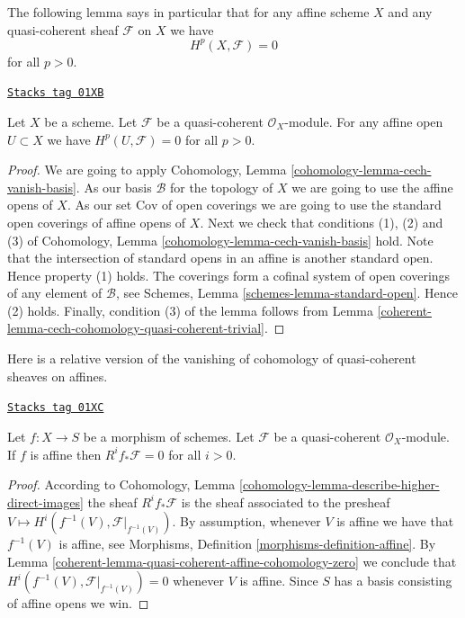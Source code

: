 The following lemma says in particular that for any affine scheme
$X$ and any quasi-coherent sheaf $\mathcal{F}$ on $X$ we have
$$
H^p(X, \mathcal{F}) = 0
$$
for all $p > 0$.

\begin{lemma}
\label{coherent-lemma-quasi-coherent-affine-cohomology-zero}
\href{https://stacks.math.columbia.edu/tag/01XB}{\texttt{Stacks tag 01XB}}


Let $X$ be a scheme.
Let $\mathcal{F}$ be a quasi-coherent $\mathcal{O}_X$-module.
For any affine open $U \subset X$ we have
$H^p(U, \mathcal{F}) = 0$ for all $p > 0$.
\end{lemma}

\begin{proof}

We are going to apply
Cohomology, Lemma \ref{cohomology-lemma-cech-vanish-basis}.
As our basis $\mathcal{B}$ for the topology of $X$ we are going to use
the affine opens of $X$.
As our set $\text{Cov}$ of open coverings we are going to use the standard
open coverings of affine opens of $X$.
Next we check that conditions (1), (2) and (3) of
Cohomology, Lemma \ref{cohomology-lemma-cech-vanish-basis}
hold. Note that the intersection of standard opens in an affine is
another standard open. Hence property (1) holds.
The coverings form a cofinal system of open coverings of any element
of $\mathcal{B}$, see
Schemes, Lemma \ref{schemes-lemma-standard-open}.
Hence (2) holds.
Finally, condition (3) of the lemma follows from
Lemma \ref{coherent-lemma-cech-cohomology-quasi-coherent-trivial}.
\end{proof}

Here is a relative version of the vanishing of cohomology of quasi-coherent
sheaves on affines.

\begin{lemma}
\label{coherent-lemma-relative-affine-vanishing}
\href{https://stacks.math.columbia.edu/tag/01XC}{\texttt{Stacks tag 01XC}}

Let $f : X \to S$ be a morphism of schemes.
Let $\mathcal{F}$ be a quasi-coherent $\mathcal{O}_X$-module.
If $f$ is affine then $R^if_*\mathcal{F} = 0$ for all $i > 0$.
\end{lemma}

\begin{proof}

According to
Cohomology, Lemma \ref{cohomology-lemma-describe-higher-direct-images}
the sheaf
$R^if_*\mathcal{F}$ is the sheaf associated to the presheaf
$V \mapsto H^i(f^{-1}(V), \mathcal{F}|_{f^{-1}(V)})$.
By assumption, whenever $V$ is affine we have that $f^{-1}(V)$ is
affine, see Morphisms, Definition \ref{morphisms-definition-affine}.
By Lemma \ref{coherent-lemma-quasi-coherent-affine-cohomology-zero} we conclude that
$H^i(f^{-1}(V), \mathcal{F}|_{f^{-1}(V)}) = 0$
whenever $V$ is affine. Since $S$ has a basis consisting of affine
opens we win.
\end{proof}

